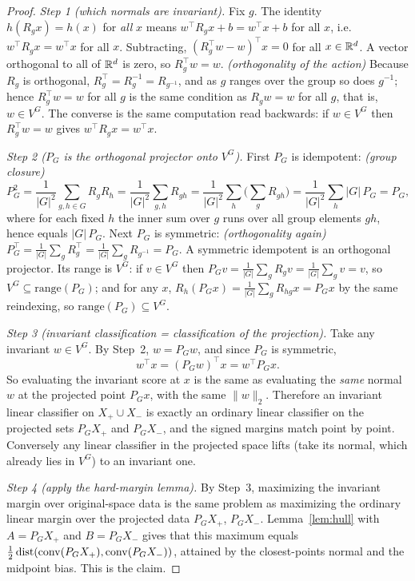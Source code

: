 \begin{proof}
\emph{Step 1 (which normals are invariant).}
Fix $g$. The identity $h(R_g x) = h(x)$ for \emph{all} $x$ means $w^\top R_g x + b = w^\top x + b$
for all $x$, i.e. $w^\top R_g x = w^\top x$ for all $x$. Subtracting, $(R_g^\top w - w)^\top x = 0$
for all $x \in \mathbb{R}^d$. A vector orthogonal to all of $\mathbb{R}^d$ is zero, so $R_g^\top w = w$.
\emph{(orthogonality of the action)} Because $R_g$ is orthogonal, $R_g^\top = R_g^{-1} = R_{g^{-1}}$,
and as $g$ ranges over the group so does $g^{-1}$; hence $R_g^\top w = w$ for all $g$ is the same
condition as $R_g w = w$ for all $g$, that is, $w \in V^G$. The converse is the same computation read
backwards: if $w \in V^G$ then $R_g^\top w = w$ gives $w^\top R_g x = w^\top x$.

\emph{Step 2 ($P_G$ is the orthogonal projector onto $V^G$).}
First $P_G$ is idempotent: \emph{(group closure)}
\[
P_G^2 = \frac{1}{|G|^2}\sum_{g,h\in G} R_g R_h
       = \frac{1}{|G|^2}\sum_{g,h} R_{gh}
       = \frac{1}{|G|^2}\sum_{h}\Big(\sum_g R_{gh}\Big)
       = \frac{1}{|G|^2}\sum_{h} |G|\,P_G = P_G,
\]
where for each fixed $h$ the inner sum over $g$ runs over all group elements $gh$, hence equals
$|G|\,P_G$. Next $P_G$ is symmetric: \emph{(orthogonality again)}
$P_G^\top = \frac{1}{|G|}\sum_g R_g^\top = \frac{1}{|G|}\sum_g R_{g^{-1}} = P_G$. A symmetric
idempotent is an orthogonal projector. Its range is $V^G$: if $v\in V^G$ then $P_G v = \frac1{|G|}
\sum_g R_g v = \frac1{|G|}\sum_g v = v$, so $V^G \subseteq \mathrm{range}(P_G)$; and for any $x$,
$R_h(P_G x) = \frac1{|G|}\sum_g R_{hg} x = P_G x$ by the same reindexing, so
$\mathrm{range}(P_G)\subseteq V^G$.

\emph{Step 3 (invariant classification = classification of the projection).}
Take any invariant $w \in V^G$. By Step~2, $w = P_G w$, and since $P_G$ is symmetric,
\[
w^\top x = (P_G w)^\top x = w^\top P_G x .
\]
So evaluating the invariant score at $x$ is the same as evaluating the \emph{same} normal $w$ at the
projected point $P_G x$, with the same $\|w\|_2$. Therefore an invariant linear classifier on
$X_+ \cup X_-$ is exactly an ordinary linear classifier on the projected sets $P_G X_+$ and
$P_G X_-$, and the signed margins match point by point. Conversely any linear classifier in the
projected space lifts (take its normal, which already lies in $V^G$) to an invariant one.

\emph{Step 4 (apply the hard-margin lemma).}
By Step~3, maximizing the invariant margin over original-space data is the same problem as
maximizing the ordinary linear margin over the projected data $P_G X_+$, $P_G X_-$.
Lemma~\ref{lem:hull} with $A = P_G X_+$ and $B = P_G X_-$ gives that this maximum equals
$\tfrac12\operatorname{dist}(\operatorname{conv}(P_G X_+),\operatorname{conv}(P_G X_-))$, attained by the closest-points normal and the
midpoint bias. This is the claim.
\end{proof}

